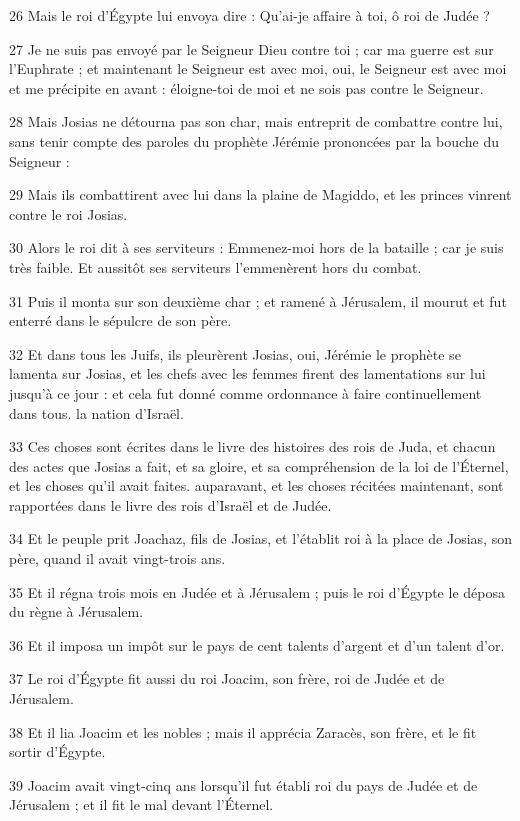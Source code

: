 \par 26 Mais le roi d'Égypte lui envoya dire : Qu'ai-je affaire à toi, ô roi de Judée ?
\par 27 Je ne suis pas envoyé par le Seigneur Dieu contre toi ; car ma guerre est sur l'Euphrate ; et maintenant le Seigneur est avec moi, oui, le Seigneur est avec moi et me précipite en avant : éloigne-toi de moi et ne sois pas contre le Seigneur.
\par 28 Mais Josias ne détourna pas son char, mais entreprit de combattre contre lui, sans tenir compte des paroles du prophète Jérémie prononcées par la bouche du Seigneur :
\par 29 Mais ils combattirent avec lui dans la plaine de Magiddo, et les princes vinrent contre le roi Josias.
\par 30 Alors le roi dit à ses serviteurs : Emmenez-moi hors de la bataille ; car je suis très faible. Et aussitôt ses serviteurs l'emmenèrent hors du combat.
\par 31 Puis il monta sur son deuxième char ; et ramené à Jérusalem, il mourut et fut enterré dans le sépulcre de son père.
\par 32 Et dans tous les Juifs, ils pleurèrent Josias, oui, Jérémie le prophète se lamenta sur Josias, et les chefs avec les femmes firent des lamentations sur lui jusqu'à ce jour : et cela fut donné comme ordonnance à faire continuellement dans tous. la nation d'Israël.
\par 33 Ces choses sont écrites dans le livre des histoires des rois de Juda, et chacun des actes que Josias a fait, et sa gloire, et sa compréhension de la loi de l'Éternel, et les choses qu'il avait faites. auparavant, et les choses récitées maintenant, sont rapportées dans le livre des rois d'Israël et de Judée.
\par 34 Et le peuple prit Joachaz, fils de Josias, et l'établit roi à la place de Josias, son père, quand il avait vingt-trois ans.
\par 35 Et il régna trois mois en Judée et à Jérusalem ; puis le roi d'Égypte le déposa du règne à Jérusalem.
\par 36 Et il imposa un impôt sur le pays de cent talents d'argent et d'un talent d'or.
\par 37 Le roi d'Égypte fit aussi du roi Joacim, son frère, roi de Judée et de Jérusalem.
\par 38 Et il lia Joacim et les nobles ; mais il apprécia Zaracès, son frère, et le fit sortir d'Égypte.
\par 39 Joacim avait vingt-cinq ans lorsqu'il fut établi roi du pays de Judée et de Jérusalem ; et il fit le mal devant l'Éternel.

